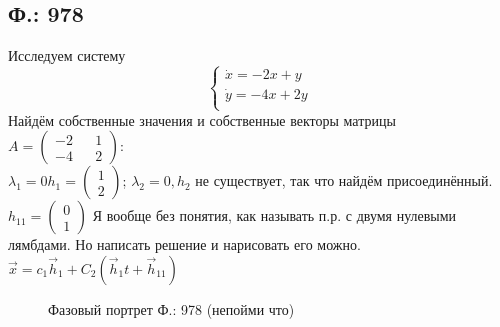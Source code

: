 \documentclass{article}
\begin{document}
\subsection{Ф.: 978}
Исследуем систему 
\begin{equation}
\begin{cases}
        \dot{x}=-2x+y\\
        \dot{y}=-4x+2y\\
    \end{cases}    
\end{equation}
Найдём собственные значения и собственные векторы матрицы $A=\begin{pmatrix}-2 && 1 \\ -4 && 2 \end{pmatrix}$:\\
 $\lambda_1=0
 h_1 = \begin{pmatrix} 1  \\  2 \end{pmatrix} $; 
 $\lambda_2= 0,
 h_2 $ не существует, так что найдём присоединённый. \\
 $h_{11}= \begin{pmatrix} 0  \\  1 \end{pmatrix}$
 Я вообще без понятия, как называть п.р. с двумя нулевыми лямбдами. Но написать решение и нарисовать его можно. $\vec x = c_1 \vec h_1 + C_2 (\vec h_1 t + \vec h_{11})$
 \begin{figure}[ht]
\caption{Фазовый портрет Ф.: 978 (непойми что)}
\label{978}
\end{figure}\\
\end{document}
